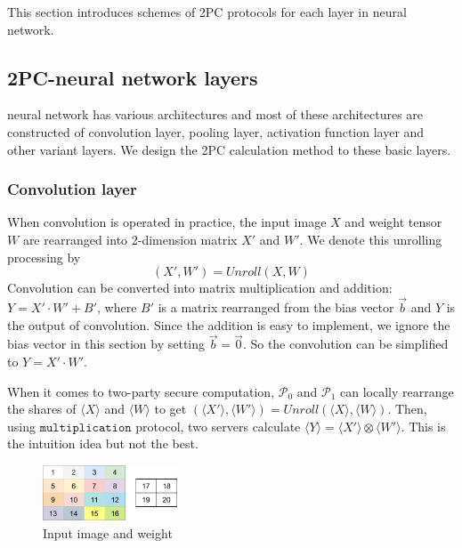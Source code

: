 \documentclass[letterpaper]{article} %
\begin{document}
       This section introduces schemes
       of 2PC protocols for each layer in neural network.


    \subsection{2PC-neural network layers}

    neural network has various architectures and
    most of these architectures are constructed of convolution layer,
    pooling layer, activation function layer and other variant layers.
    We design the 2PC calculation method to these basic layers.

    \subsubsection{Convolution layer}


    When convolution is operated in practice,
    the input image $X$ and weight tensor $W$
    are rearranged into 2-dimension matrix $X'$ and $W'$.
    We denote this unrolling processing by
    $$(X',W')=Unroll(X,W)$$
    Convolution can be converted into matrix multiplication and addition:
    $Y=X'\cdot W'+B'$, where $B'$ is a matrix rearranged from the bias vector $\overrightarrow{b}$ and
    $Y$ is the output of convolution.
    Since the addition is easy to implement, we ignore the bias vector in this section by setting $\overrightarrow{b}=\overrightarrow{0}$.
    So the convolution can be simplified to $Y=X'\cdot W'$.

    When it comes to two-party secure computation,
    $\mathcal{P}_{0}$ and $\mathcal{P}_{1}$ can locally
    rearrange the shares of $\langle X\rangle$ and $\langle W\rangle$ to get
    $(\langle X'\rangle,\langle W'\rangle)=Unroll(\langle X\rangle,\langle W\rangle)$.
    Then, using $\mathtt{multiplication}$ protocol,
    two servers calculate $\langle Y\rangle=\langle X'\rangle\otimes \langle W'\rangle$.
    This is the intuition idea but not the best.

    \begin{figure}[htbp]
        \centering
        \includegraphics[width=4cm]{new_unrolling.png}
        \caption{Input image and weight}
        \label{input image and weight}
    \end{figure}
\end{document}
